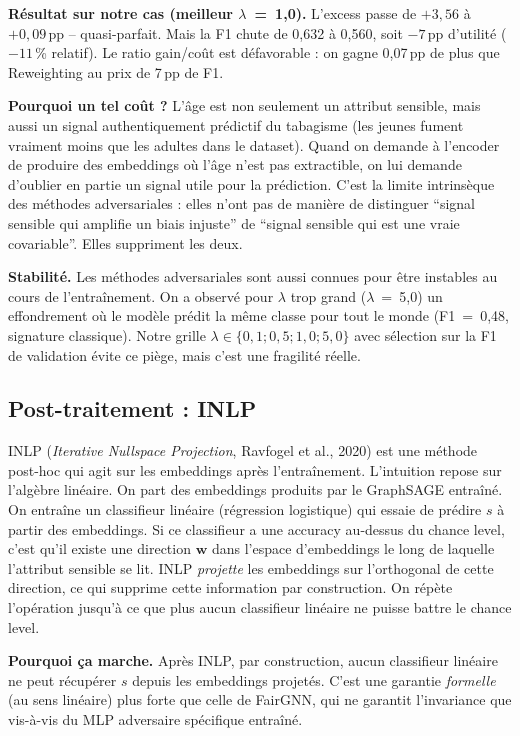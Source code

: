 \documentclass[10pt,a4paper,twocolumn]{article}
\begin{document}
\textbf{Résultat sur notre cas (meilleur $\lambda$~=~1{,}0).} L'excess passe de $+3{,}56$ à $+0{,}09$\,pp -- quasi-parfait. Mais la F1 chute de 0{,}632 à 0{,}560, soit $-7$\,pp d'utilité ($-11$\,\% relatif). Le ratio gain/coût est défavorable : on gagne 0{,}07\,pp de plus que Reweighting au prix de 7\,pp de F1.

\textbf{Pourquoi un tel coût ?} L'âge est non seulement un attribut sensible, mais aussi un signal authentiquement prédictif du tabagisme (les jeunes fument vraiment moins que les adultes dans le dataset). Quand on demande à l'encoder de produire des embeddings où l'âge n'est pas extractible, on lui demande d'oublier en partie un signal utile pour la prédiction. C'est la limite intrinsèque des méthodes adversariales : elles n'ont pas de manière de distinguer ``signal sensible qui amplifie un biais injuste'' de ``signal sensible qui est une vraie covariable''. Elles suppriment les deux.

\textbf{Stabilité.} Les méthodes adversariales sont aussi connues pour être instables au cours de l'entraînement. On a observé pour $\lambda$ trop grand ($\lambda$~=~5{,}0) un effondrement où le modèle prédit la même classe pour tout le monde (F1~=~0{,}48, signature classique). Notre grille $\lambda \in \{0{,}1; 0{,}5; 1{,}0; 5{,}0\}$ avec sélection sur la F1 de validation évite ce piège, mais c'est une fragilité réelle.

\subsection{Post-traitement : INLP}

INLP (\emph{Iterative Nullspace Projection}, Ravfogel et al., 2020) est une méthode post-hoc qui agit sur les embeddings après l'entraînement. L'intuition repose sur l'algèbre linéaire. On part des embeddings produits par le GraphSAGE entraîné. On entraîne un classifieur linéaire (régression logistique) qui essaie de prédire $s$ à partir des embeddings. Si ce classifieur a une accuracy au-dessus du chance level, c'est qu'il existe une direction $\mathbf{w}$ dans l'espace d'embeddings le long de laquelle l'attribut sensible se lit. INLP \emph{projette} les embeddings sur l'orthogonal de cette direction, ce qui supprime cette information par construction. On répète l'opération jusqu'à ce que plus aucun classifieur linéaire ne puisse battre le chance level.

\textbf{Pourquoi ça marche.} Après INLP, par construction, aucun classifieur linéaire ne peut récupérer $s$ depuis les embeddings projetés. C'est une garantie \emph{formelle} (au sens linéaire) plus forte que celle de FairGNN, qui ne garantit l'invariance que vis-à-vis du MLP adversaire spécifique entraîné.
\end{document}
